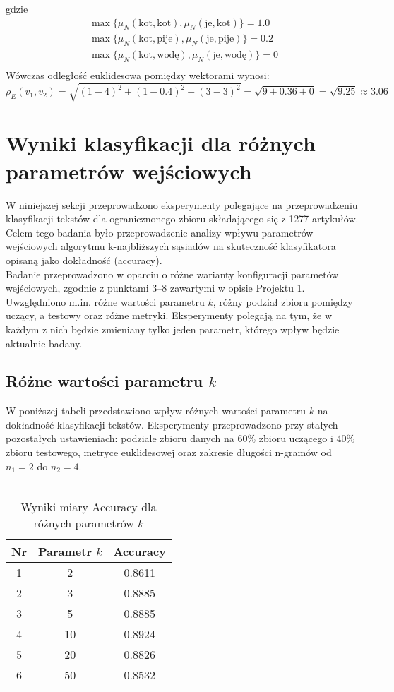 \documentclass{article}
\begin{document}
gdzie
\[
\begin{aligned}
\max \{\mu_N(\text{kot}, \text{kot}), \mu_N(\text{je}, \text{kot})\} = 1.0 \\
\max \{\mu_N(\text{kot}, \text{pije}), \mu_N(\text{je}, \text{pije})\} = 0.2 \\
\max \{\mu_N(\text{kot}, \text{wodę}), \mu_N(\text{je}, \text{wodę})\} = 0 \\
\end{aligned}
\]
Wówczas odległość euklidesowa pomiędzy wektorami wynosi:
\[
\rho_E(v_1, v_2) = \sqrt{(1 - 4)^2 + (1 - 0.4)^2 + (3 - 3)^2} = \sqrt{9 + 0.36 + 0} = \sqrt{9.25} \approx 3.06
\]

\section{Wyniki klasyfikacji dla różnych parametrów wejściowych}
W niniejszej sekcji przeprowadzono eksperymenty polegające na przeprowadzeniu klasyfikacji tekstów dla ogranicznonego zbioru składającego się z 1277 artykułów. Celem tego badania było przeprowadzenie analizy wpływu parametrów wejściowych algorytmu k-najbliższych sąsiadów na skuteczność klasyfikatora opisaną jako dokładność (accuracy). \\
Badanie przeprowadzono w oparciu o różne warianty konfiguracji parametów wejściowych, zgodnie z punktami 3–8 zawartymi w opisie Projektu 1. Uwzględniono m.in. różne wartości parametru \(k\), różny podział zbioru pomiędzy uczący, a testowy oraz różne metryki. Eksperymenty polegają na tym, że w każdym z nich będzie zmieniany tylko jeden parametr, którego wpływ będzie aktualnie badany.

\subsection{Różne wartości parametru \(k\)}
W poniższej tabeli przedstawiono wpływ różnych wartości parametru \(k\) na dokładność klasyfikacji tekstów. Eksperymenty przeprowadzono przy stałych pozostałych ustawieniach: podziale zbioru danych na 60\% zbioru uczącego i 40\% zbioru testowego, metryce euklidesowej oraz zakresie długości n-gramów od \(n_1 = 2\) do \(n_2 = 4\). \\
\\
\begin{table}[h!]
    \centering
    \begin{tabular}{|c|c|c|}
    \hline
    \textbf{Nr} & \textbf{Parametr \(k\)} & \textbf{Accuracy} \\ \hline
    1 & 2 & 0.8611\\ \hline
    2 & 3 & 0.8885 \\ \hline
    3 & 5 & 0.8885 \\ \hline
    4 & 10 & 0.8924 \\ \hline
    5 & 20 & 0.8826 \\ \hline
    6 & 50 & 0.8532 \\ \hline    
    \end{tabular}
    \caption{Wyniki miary Accuracy dla różnych parametrów \(k\)}
\end{table}
\end{document}
